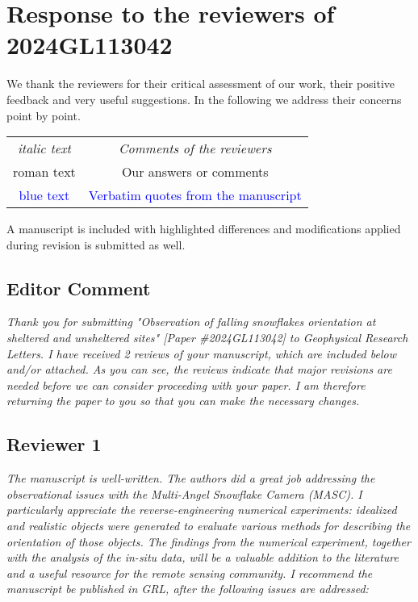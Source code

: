 \documentclass[12pt]{article}
\newcommand*{\blue}{\textcolor{blue}}
\begin{document}
\section*{Response to the reviewers of 2024GL113042 }

We thank the reviewers for their critical assessment of our work, their positive feedback and very useful suggestions. 
In the following we address their concerns point by point.\\

\noindent

\begin{table}[H]
\centering
\begin{tabular}{ |c|c| } 
 \hline
 {\itshape italic text  } & {\itshape Comments of the reviewers}  \\ 
 roman text               & Our answers or comments   \\ 
 \blue{blue text}         & \blue{Verbatim quotes from the manuscript}  \\ 
 \hline
\end{tabular}
\end{table}

\noindent
A manuscript is included with highlighted differences and modifications applied during revision is submitted as well. 


\subsection*{Editor Comment}
\textit{Thank you for submitting "Observation of falling snowflakes orientation at sheltered and unsheltered sites" [Paper \#2024GL113042] to Geophysical Research Letters. I have received 2 reviews of your manuscript, which are included below and/or attached. As you can see, the reviews indicate that major revisions are needed before we can consider proceeding with your paper. I am therefore returning the paper to you so that you can make the necessary changes.
}

\newpage
\subsection*{Reviewer 1}

\textit{The manuscript is well-written. The authors did a great job addressing the observational issues with the Multi-Angel Snowflake Camera (MASC). I particularly appreciate the reverse-engineering numerical experiments: idealized and realistic objects were generated to evaluate various methods for describing the orientation of those objects. The findings from the numerical experiment, together with the analysis of the in-situ data, will be a valuable addition to the literature and a useful resource for the remote sensing community. I recommend the manuscript be published in GRL, after the following issues are addressed:}
\end{document}
